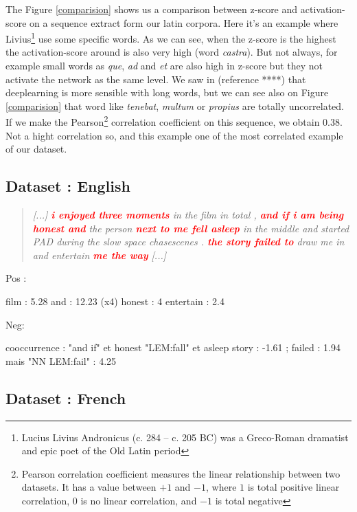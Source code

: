 The Figure \ref{comparision} shows us a comparison between z-score and activation-score on a sequence extract form our latin corpora. Here it's an example where Livius\footnote{Lucius Livius Andronicus (c. 284 – c. 205 BC) was a Greco-Roman dramatist and epic poet of the Old Latin period} use some specific words. As we can see, when the z-score is the highest the activation-score around is also very high (word \textit{castra}). But not always, for example small words as \textit{que}, \textit{ad} and \textit{et} are also high in z-score but they not activate the network as the same level. We saw in (reference ****) that deeplearning is more sensible with long words, but we can see also on Figure \ref{comparision} that word like \textit{tenebat}, \textit{multum} or \textit{propius} are totally uncorrelated. If we make the Pearson\footnote{Pearson correlation coefficient measures the linear relationship between two datasets. It has a value between $+1$ and $-1$, where $1$ is total positive linear correlation, $0$ is no linear correlation, and $-1$ is total negative} correlation coefficient on this sequence, we obtain 0.38. Not a hight correlation so, and this example one of the most correlated example of our dataset.

\subsection{Dataset : English}

\begin{quote}
\textit{[...] \textcolor{red}{\textbf{i enjoyed three moments}} in the film in total , \textcolor{red}{\textbf{and if i am being honest and}} the person \textcolor{red}{\textbf{next to me fell asleep}} in the middle and started PAD during the slow space chasescenes . \textcolor{red}{\textbf{the story failed to}} draw me in and entertain \textcolor{red}{\textbf{me the way}} [...]} 
\end{quote}

Pos : 

    film : 5.28
    and : 12.23 (x4)
    honest : 4
    entertain : 2.4

Neg:

    cooccurrence : 
        "and if" et honest
        "LEM:fall" et asleep
        story :  -1.61  ;   failed : 1.94    mais "NN LEM:fail" : 4.25


\subsection{Dataset : French}

